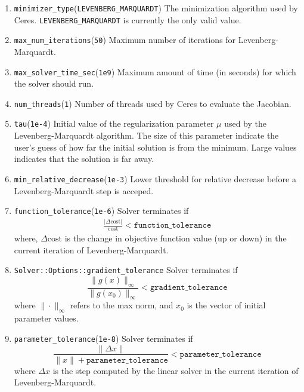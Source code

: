 \begin{enumerate}
\item{\texttt{minimizer\_type}}(\texttt{LEVENBERG\_MARQUARDT}) The  minimization algorithm used by Ceres. \texttt{LEVENBERG\_MARQUARDT} is currently the only valid value.

\item{\texttt{max\_num\_iterations}}(\texttt{50}) Maximum number of iterations for Levenberg-Marquardt.

\item{\texttt{max\_solver\_time\_sec}}(\texttt{1e9}) Maximum amount of time (in seconds) for which the solver should run.

\item{\texttt{num\_threads}}(\texttt{1})
Number of threads used by Ceres to evaluate the Jacobian.

\item{\texttt{tau}}(\texttt{1e-4}) Initial value of the regularization parameter $\mu$ used by the Levenberg-Marquardt algorithm. The size of this parameter indicate the user's guess of how far the initial solution is from the minimum. Large values indicates that the solution is far away.

\item{\texttt{min\_relative\_decrease}}(\texttt{1e-3}) Lower threshold for relative decrease before a Levenberg-Marquardt step is acceped.


\item{\texttt{function\_tolerance}}(\texttt{1e-6}) Solver terminates if
\begin{align}
\frac{|\Delta \text{cost}|}{\text{cost}} < \texttt{function\_tolerance}
\end{align}
where, $\Delta \text{cost}$ is the change in objective function value (up or down) in the current iteration of Levenberg-Marquardt.

\item \texttt{Solver::Options::gradient\_tolerance} Solver terminates if 
\begin{equation}
    \frac{\|g(x)\|_\infty}{\|g(x_0)\|_\infty} < \texttt{gradient\_tolerance}
\end{equation}
where $\|\cdot\|_\infty$ refers to the max norm, and $x_0$ is the vector of initial parameter values.

\item{\texttt{parameter\_tolerance}}(\texttt{1e-8}) Solver terminates if 
\begin{equation}
	\frac{\|\Delta x\|}{\|x\| + \texttt{parameter\_tolerance}} < \texttt{parameter\_tolerance}
\end{equation}
where $\Delta x$ is the step computed by the linear solver in the current iteration of Levenberg-Marquardt.


\end{enumerate}

